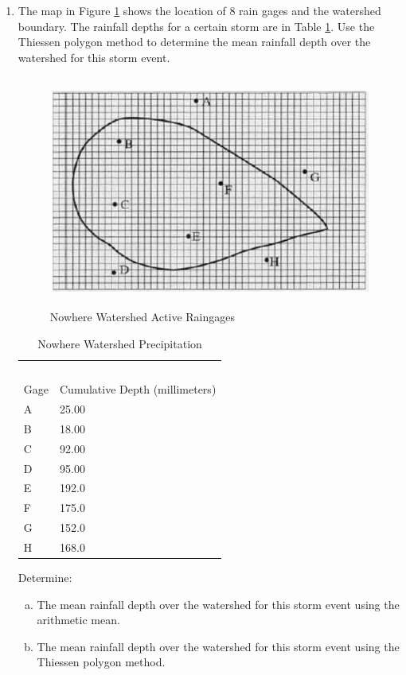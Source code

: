 \documentclass[12pt]{article}
\begin{document}
\begin{enumerate}
    
\clearpage

\item The map in Figure \ref{fig:gagemap} shows the location of 8 rain gages and the watershed boundary. The rainfall depths for a certain storm are in Table \ref{tab:gagemap}. Use the Thiessen polygon method to determine the mean rainfall depth over the watershed for this storm event.

\begin{figure}[h!] %
   \centering
   \includegraphics[height=3in]{gagemap.png} 
   \caption{Nowhere Watershed Active Raingages}
   \label{fig:gagemap}
\end{figure}

\begin{table}[h!]
\centering
\caption{Nowhere Watershed Precipitation}
\begin{tabular}{p{2.0in}p{2.0in}} %
~&~\\
Gage & Cumulative Depth (millimeters)\\
\hline
\hline
A & 25.00 \\
B & 18.00 \\
C & 92.00 \\
D & 95.00 \\
E & 192.0 \\
F & 175.0 \\
G & 152.0 \\
H & 168.0 \\

\hline
\end{tabular}
\label{tab:gagemap}
\end{table}

Determine:
    \begin{enumerate}[a)]
        \item The mean rainfall depth over the watershed for this storm event using the arithmetic mean. 
        \item The mean rainfall depth over the watershed for this storm event using the Thiessen polygon method. 
    \end{enumerate}


\end{enumerate}
\end{document}
